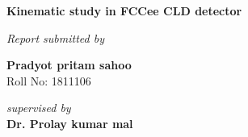 \begin{changemargin}{0cm}{0cm}
\thispagestyle{empty}
\baselineskip25pt
\begin{center}
{\Large {\bf Kinematic study  in FCCee CLD detector}}\\
\end{center}

\vfill
\baselineskip15pt
\begin{center}
{\em  Report submitted by} \\


\end{center}
\baselineskip25pt

\vfill
\begin{center} %
{\large{\bf Pradyot pritam sahoo}} \\
{\large{ Roll No: 1811106}} \\
\vspace{20pt}

\textit{supervised by }\\
{\large{\bf Dr. Prolay kumar mal}} \\

\end{center}


\end{changemargin}

